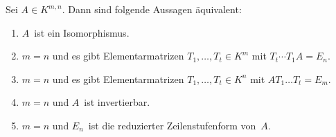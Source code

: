 \documentclass[a4paper]{article}
\begin{document}
\begin{theorem}\label{thm:matrix:inverse:properties}
    Sei $A \in K^{m,n}$. Dann sind folgende Aussagen äquivalent:
    \begin{enumerate}
        \item $A$~ist ein Isomorphismus.\label{thm:matrix:inverse:properties:1}
        \item $m = n$ und es gibt Elementarmatrizen $T_1,\dots,T_t \in K^m$ mit $T_t\cdots T_1A = E_n$.\label{thm:matrix:inverse:properties:2}
        \item $m = n$ und es gibt Elementarmatrizen $T_1,\dots,T_t \in K^n$ mit $AT_1\dots T_t = E_m$.\label{thm:matrix:inverse:properties:3}
        \item $m = n$ und $A$~ist invertierbar.\label{thm:matrix:inverse:properties:4}
        \item $m = n$ und $E_n$~ist die reduzierter Zeilenstufenform von~$A$.\label{thm:matrix:inverse:properties:5}
    \end{enumerate}
\end{theorem}
\end{document}
